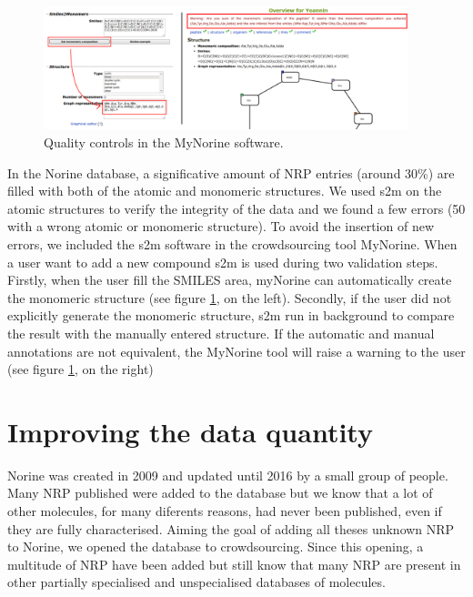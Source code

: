 \documentclass[long, final]{jobim2017}
\begin{document}
 \begin{figure}
   \begin{center}
     \includegraphics[width=400px]{figs/warnings.png}
   \end{center}
   \caption{Quality controls in the MyNorine software.}
   \label{fig:warnings}
 \end{figure}

In the Norine database, a significative amount of NRP entries (around 30\%) are filled with both of the atomic and monomeric structures.
We used s2m on the atomic structures to verify the integrity of the data and we found a few errors (50 with a wrong atomic or monomeric structure).
To avoid the insertion of new errors, we included the s2m software in the crowdsourcing tool MyNorine.
When a user want to add a new compound s2m is used during two validation steps.
Firstly, when the user fill the SMILES area, myNorine can automatically create the monomeric structure (see figure \ref{fig:warnings}, on the left).
Secondly, if the user did not explicitly generate the monomeric structure, s2m run in background to compare the result with the manually entered structure.
If the automatic and manual annotations are not equivalent, the MyNorine tool will raise a warning to the user (see figure \ref{fig:warnings}, on the right)


\section{Improving the data quantity}

Norine was created in 2009 and updated until 2016 by a small group of people.
Many NRP published were added to the database but we know that a lot of other molecules, for many diferents reasons, had never been published, even if they are fully characterised.
Aiming the goal of adding all theses unknown NRP to Norine, we opened the database to crowdsourcing.
Since this opening, a multitude of NRP have been added but still know that many NRP are present in other partially specialised and unspecialised databases of molecules.
\end{document}
